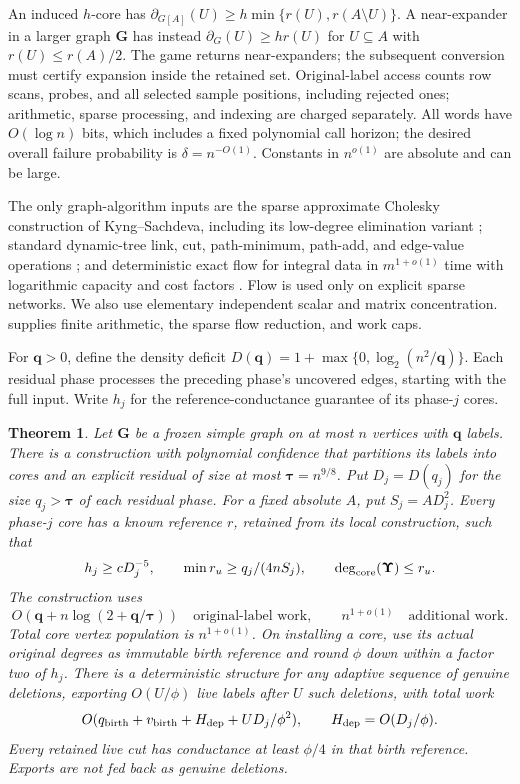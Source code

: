 \documentclass[11pt]{article}
\newtheorem{theorem}{Theorem}[section]
\theoremstyle{remark}
\newcommand{\ttau}{\boldsymbol{\tau}}
\newcommand{\UUps}{\boldsymbol{\Upsilon}}
\newcommand{\GG}{\mathbf G}
\newcommand{\qq}{\mathbf q}
\begin{document}
An induced $h$-core has $\partial_{G[A]}(U)\ge h\min\{r(U),r(A\setminus U)\}$.
A near-expander in a larger graph $\GG$ has instead $\partial_G(U)\ge h r(U)$ for
$U\subseteq A$ with $r(U)\le r(A)/2$.
The game returns near-expanders; the subsequent conversion must certify
expansion inside the retained set.
Original-label access counts row scans, probes, and all selected sample
positions, including rejected ones; arithmetic, sparse processing, and indexing
are charged separately.
All words have $O(\log n)$ bits, which includes a fixed polynomial call
horizon; the desired overall failure probability is
$\delta=n^{-O(1)}$.
Constants in $n^{o(1)}$ are absolute and can be large.

The only graph-algorithm inputs are the sparse approximate Cholesky construction
of Kyng--Sachdeva, including its low-degree elimination variant
\cite{KS16:conf}; standard dynamic-tree link, cut, path-minimum, path-add, and
edge-value operations \cite{ST83:journal}; and deterministic exact flow for
integral data in $m^{1+o(1)}$ time with logarithmic capacity and cost factors
\cite[Theorem~1.1]{BCPKLPSS23:conf}.
Flow is used only on explicit sparse networks.
We also use elementary independent scalar and matrix concentration.
 supplies finite arithmetic, the sparse flow
reduction, and work caps.

For $\qq>0$, define the density deficit $D(\qq)=1+\max\{0, \log_2(n^2/\qq) \}$.
Each residual phase processes the preceding phase's uncovered edges, starting
with the full input.
Write $h_j$ for the reference-conductance guarantee of its phase-$j$ cores.

\begin{theorem}\label{struct27:thm:main}
Let $\GG$ be a frozen simple graph on at most $n$ vertices with $\qq$ labels.
There is a construction with polynomial confidence that partitions its labels
into cores and an explicit residual of size at most $\ttau= n^{9/8} $.
Put $D_j=D(q_j)$ for the size $q_j>\ttau$ of each residual phase.
For a fixed absolute $A$, put $S_j=AD_j^2$.
Every phase-$j$ core has a known reference $r$, retained from its local
construction, such that
\[
 h_j\ge cD_j^{-5},\qquad
 \min r_u\ge q_j/(4nS_j),\qquad
 \deg_{\rm core}(\UUps)\le r_u.
\]
The construction uses
\[
 O(\qq+n\log(2+\qq/\ttau))\quad\text{original-label work},\qquad
 n^{1+o(1)}\quad\text{additional work}.
\]
Total core vertex population is $n^{1+o(1)}$.
On installing a core, use its actual original degrees as immutable birth
reference and round $\phi$ down within a factor two of $h_j$.
There is a deterministic structure for any adaptive sequence of genuine
deletions, exporting $O(U/\phi)$ live labels after $U$ such deletions, with
total work
\[
 O(q_{\rm birth}+v_{\rm birth}+H_{\rm dep}+UD_j/\phi^2),
 \qquad H_{\rm dep}=O(D_j/\phi).
\]
Every retained live cut has conductance at least $\phi/4$ in that birth
reference.
Exports are not fed back as genuine deletions.
\end{theorem}
\end{document}
